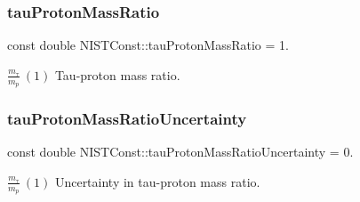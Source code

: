 \subsubsection{\texorpdfstring{tau\+Proton\+Mass\+Ratio}{tauProtonMassRatio}}
{\footnotesize\ttfamily const double N\+I\+S\+T\+Const\+::tau\+Proton\+Mass\+Ratio = 1.}

$\frac{m_\tau}{m_p} \ (1)$ Tau-\/proton mass ratio. \mbox{\label{group___n_i_s_t_const-_tau_ga8c32666623ba327b9d6d8d376fdbad3c}} 
\subsubsection{\texorpdfstring{tau\+Proton\+Mass\+Ratio\+Uncertainty}{tauProtonMassRatioUncertainty}}
{\footnotesize\ttfamily const double N\+I\+S\+T\+Const\+::tau\+Proton\+Mass\+Ratio\+Uncertainty = 0.}

$\frac{m_\tau}{m_p} \ (1)$ Uncertainty in tau-\/proton mass ratio. 